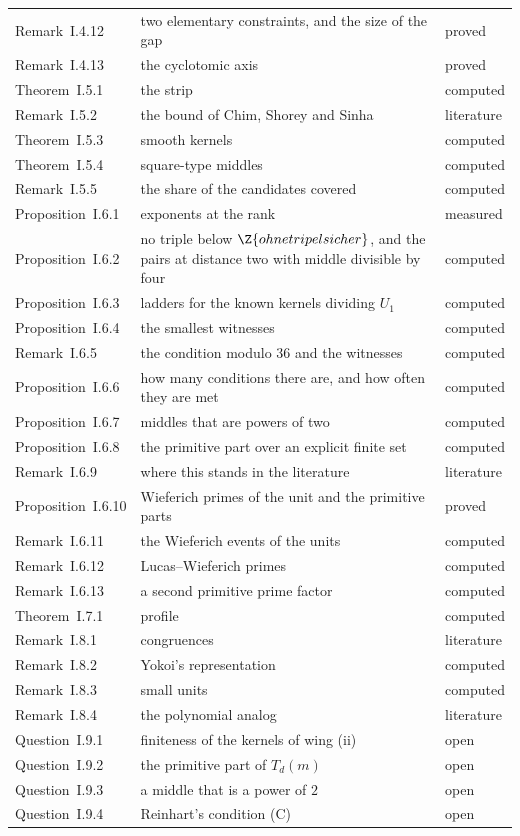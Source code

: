 \begin{longtable}{l p{7.2cm} l}
Remark~I.4.12 & two elementary constraints, and the size of the gap & proved \\
Remark~I.4.13 & the cyclotomic axis & proved \\
Theorem~I.5.1 & the strip & computed \\
Remark~I.5.2 & the bound of Chim, Shorey and Sinha & literature \\
Theorem~I.5.3 & smooth kernels & computed \\
Theorem~I.5.4 & square-type middles & computed \\
Remark~I.5.5 & the share of the candidates covered & computed \\
Proposition~I.6.1 & exponents at the rank & measured \\
Proposition~I.6.2 & no triple below $\Z{ohnetripelsicher}$, and the pairs at distance two with middle divisible by four & computed \\
Proposition~I.6.3 & ladders for the known kernels dividing $U_1$ & computed \\
Proposition~I.6.4 & the smallest witnesses & computed \\
Remark~I.6.5 & the condition modulo $36$ and the witnesses & computed \\
Proposition~I.6.6 & how many conditions there are, and how often they are met & computed \\
Proposition~I.6.7 & middles that are powers of two & computed \\
Proposition~I.6.8 & the primitive part over an explicit finite set & computed \\
Remark~I.6.9 & where this stands in the literature & literature \\
Proposition~I.6.10 & Wieferich primes of the unit and the primitive parts & proved \\
Remark~I.6.11 & the Wieferich events of the units & computed \\
Remark~I.6.12 & Lucas--Wieferich primes & computed \\
Remark~I.6.13 & a second primitive prime factor & computed \\
Theorem~I.7.1 & profile & computed \\
Remark~I.8.1 & congruences & literature \\
Remark~I.8.2 & Yokoi's representation & computed \\
Remark~I.8.3 & small units & computed \\
Remark~I.8.4 & the polynomial analog & literature \\
Question~I.9.1 & finiteness of the kernels of wing (ii) & open \\
Question~I.9.2 & the primitive part of $T_d(m)$ & open \\
Question~I.9.3 & a middle that is a power of $2$ & open \\
Question~I.9.4 & Reinhart's condition (C) & open \\
\hline
\end{longtable}
\endgroup

